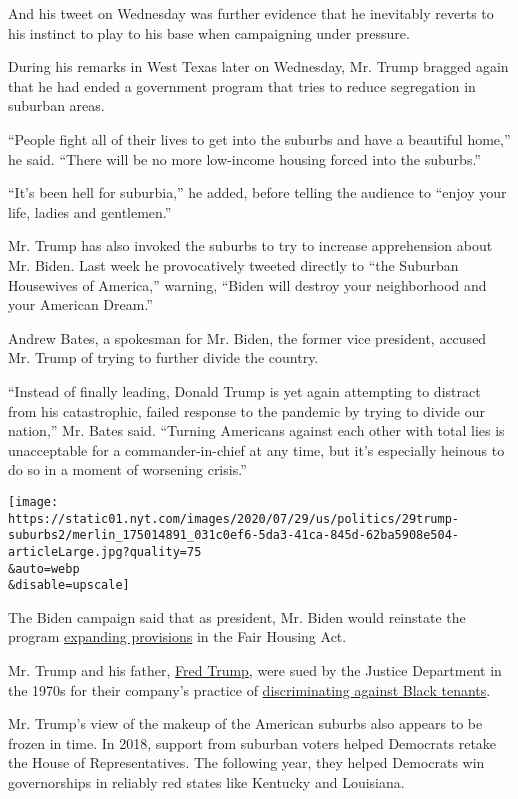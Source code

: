 And his tweet on Wednesday was further evidence that he inevitably
reverts to his instinct to play to his base when campaigning under
pressure.

During his remarks in West Texas later on Wednesday, Mr. Trump bragged
again that he had ended a government program that tries to reduce
segregation in suburban areas.

``People fight all of their lives to get into the suburbs and have a
beautiful home,'' he said. ``There will be no more low-income housing
forced into the suburbs.''

``It's been hell for suburbia,'' he added, before telling the audience
to ``enjoy your life, ladies and gentlemen.''

Mr. Trump has also invoked the suburbs to try to increase apprehension
about Mr. Biden. Last week he provocatively tweeted directly to ``the
Suburban Housewives of America,'' warning, ``Biden will destroy your
neighborhood and your American Dream.''

Andrew Bates, a spokesman for Mr. Biden, the former vice president,
accused Mr. Trump of trying to further divide the country.

``Instead of finally leading, Donald Trump is yet again attempting to
distract from his catastrophic, failed response to the pandemic by
trying to divide our nation,'' Mr. Bates said. ``Turning Americans
against each other with total lies is unacceptable for a
commander-in-chief at any time, but it's especially heinous to do so in
a moment of worsening crisis.''

\texttt{[image: https://static01.nyt.com/images/2020/07/29/us/politics/29trump-suburbs2/merlin\_175014891\_031c0ef6-5da3-41ca-845d-62ba5908e504-articleLarge.jpg?quality=75\\\&auto=webp\\\&disable=upscale]}

The Biden campaign said that as president, Mr. Biden would reinstate the
program
\href{https://www.hud.gov/press/press_releases_media_advisories/HUD_No_20_109}{expanding
provisions} in the Fair Housing Act.

Mr. Trump and his father,
\href{https://www.nytimes.com/2020/07/28/us/politics/donald-fred-trump.html?searchResultPosition=1}{Fred
Trump}, were sued by the Justice Department in the 1970s for their
company's practice of
\href{https://www.nytimes.com/2016/08/28/us/politics/donald-trump-housing-race.html}{discriminating
against Black tenants}.

Mr. Trump's view of the makeup of the American suburbs also appears to
be frozen in time. In 2018, support from suburban voters helped
Democrats retake the House of Representatives. The following year, they
helped Democrats win governorships in reliably red states like Kentucky
and Louisiana.

